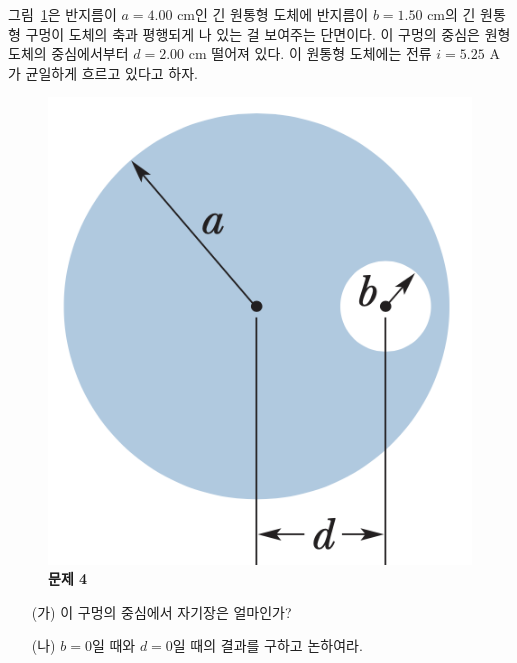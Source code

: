 \documentclass[tightenlines,floatfix,nofootinbib,superscriptaddress,fleqn]{revtex4}
\begin{document}
그림~\ref{fig:4}은 반지름이 $a=4.00$ cm인 긴 원통형 도체에 반지름이
$b=1.50$ cm의 긴 원통형 구멍이 도체의 축과 평행되게 나 있는 걸
보여주는 단면이다.  이 구멍의 중심은 원형 도체의 중심에서부터 $d=2.00$
cm 떨어져 있다. 이 원통형 도체에는 전류 $i=5.25$ A가 균일하게 흐르고
있다고 하자. 
\begin{figure}[htp]
  \centering
  \includegraphics[scale=0.55]{qfig10-3.png}
  \caption{\textbf{문제 4}}
  \label{fig:4}
\end{figure}
\begin{itemize}
\item[(가)] 이 구멍의 중심에서 자기장은 얼마인가?
\item[(나)] $b=0$일 때와 $d=0$일 때의 결과를 구하고 논하여라. 
\end{itemize}
\end{document}

